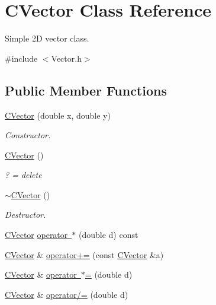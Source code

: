 \hypertarget{class_c_vector}{}\section{C\+Vector Class Reference}
\label{class_c_vector}


Simple 2D vector class.  




{\ttfamily \#include $<$Vector.\+h$>$}

\subsection*{Public Member Functions}
\begin{DoxyCompactItemize}
\item 
\mbox{\hyperlink{class_c_vector_a4c3513341ee5fc6d1e98d8af801571b0}{C\+Vector}} (double x, double y)
\begin{DoxyCompactList}\small\item\em Constructor. \end{DoxyCompactList}\item 
\mbox{\hyperlink{class_c_vector_a0f8bc94615cdb6e7c2016ac33c397197}{C\+Vector}} ()
\begin{DoxyCompactList}\small\item\em ? = delete \end{DoxyCompactList}\item 
\mbox{\hyperlink{class_c_vector_a29b5b40a40c27f7fbdd873fc0d5e47fa}{$\sim$\+C\+Vector}} ()
\begin{DoxyCompactList}\small\item\em Destructor. \end{DoxyCompactList}\item 
\mbox{\hyperlink{class_c_vector}{C\+Vector}} \mbox{\hyperlink{class_c_vector_aaf9d43b1bf62c92b22397b3a1c04bb80}{operator $\ast$}} (double d) const
\item 
\mbox{\hyperlink{class_c_vector}{C\+Vector}} \& \mbox{\hyperlink{class_c_vector_ad763976883abeeb02a288a71127d8b4a}{operator+=}} (const \mbox{\hyperlink{class_c_vector}{C\+Vector}} \&a)
\item 
\mbox{\hyperlink{class_c_vector}{C\+Vector}} \& \mbox{\hyperlink{class_c_vector_a9c83839672581c678b3017b3e411dd4b}{operator $\ast$=}} (double d)
\item 
\mbox{\hyperlink{class_c_vector}{C\+Vector}} \& \mbox{\hyperlink{class_c_vector_ae14a09fe402abf99e4a2f954bf7d153c}{operator/=}} (double d)
\item 

\end{DoxyCompactItemize}
